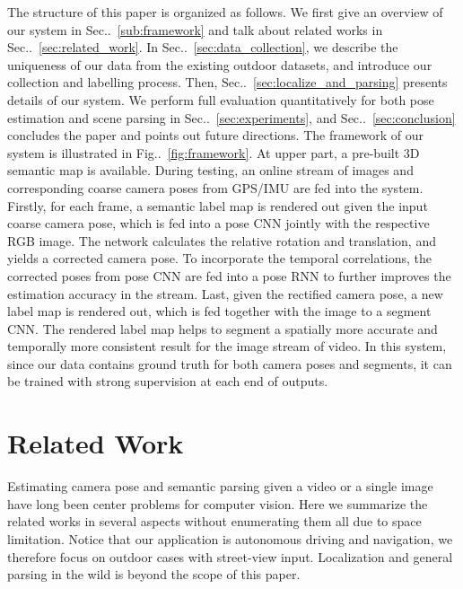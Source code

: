 \documentclass[10pt,twocolumn,letterpaper]{article}
\makeatletter
\newcommand{\figref}[1]{Fig\onedot~\ref{#1}}
\newcommand{\secref}[1]{Sec\onedot~\ref{#1}}
\DeclareRobustCommand\onedot{\futurelet\@let@token\@onedot}
\def\onedot{\ifx\@let@token.\else.\null\fi\xspace}
\makeatother
\begin{document}
The structure of this paper is organized as follows. We first give an overview of our system in \secref{sub:framework} and talk about related works in \secref{sec:related_work}. In \secref{sec:data_collection}, we describe the uniqueness of our data from the existing outdoor datasets, and introduce our collection and labelling process. 
Then, \secref{sec:localize_and_parsing} presents details of our system. We perform full evaluation quantitatively for both pose estimation and scene parsing in \secref{sec:experiments}, and \secref{sec:conclusion} concludes the paper and points out future directions. %
The framework of our system is illustrated in \figref{fig:framework}. At upper part, a pre-built 3D semantic map is available. During testing, an online stream of images and corresponding coarse camera poses from GPS/IMU are fed into the system. Firstly, for each frame, a semantic label map is rendered out given the input coarse camera pose, which is fed into a pose CNN jointly with the respective RGB image.  The network calculates the relative rotation and translation, and yields a corrected camera pose. To incorporate the temporal correlations, the corrected poses from pose CNN are fed into a pose RNN to further improves the estimation accuracy in the stream.
Last, given the rectified camera pose, a new label map is rendered out, which is fed together with the image to a segment CNN. The rendered label map helps to segment a spatially more accurate and temporally more consistent result for the image stream of video.
In this system, since our data contains ground truth for both camera poses and segments, it can be trained with strong supervision at each end of outputs.

\vspace{-0.6\baselineskip}\section{Related Work}\vspace{-0.5\baselineskip}\label{sec:related_work}
Estimating camera pose and semantic parsing given a video or a single image have long been center problems for computer vision.
Here we summarize the related works in several aspects without enumerating them all due to space limitation.
Notice that our application is autonomous driving and navigation, we therefore focus on outdoor cases with street-view input. 
Localization and general parsing in the wild is beyond the scope of this paper.
\end{document}
